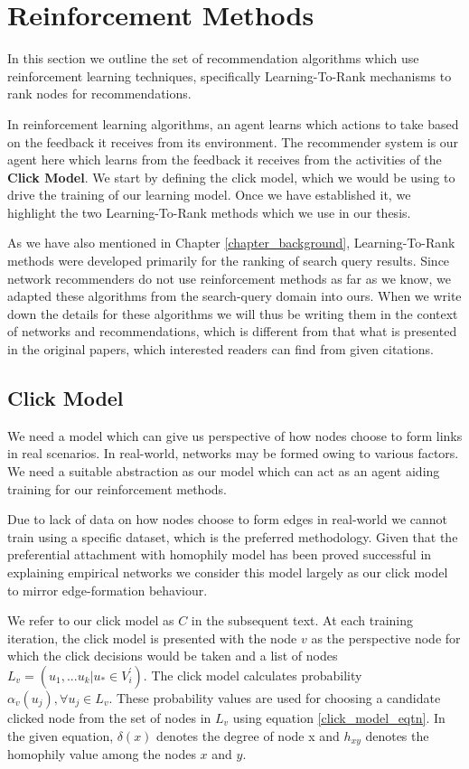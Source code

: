 \section{Reinforcement Methods}

In this section we outline the set of recommendation algorithms which use reinforcement learning techniques, specifically Learning-To-Rank mechanisms to rank nodes for recommendations. 

In reinforcement learning algorithms, an agent learns which actions to take based on the feedback it receives from its environment. The recommender system is our agent here which learns from the feedback it receives from the activities of the \textbf{Click Model}. We start by defining the click model, which we would be using to drive the training of our learning model. Once we have established it, we highlight the two Learning-To-Rank methods which we use in our thesis. 

As we have also mentioned in Chapter \ref{chapter_background}, Learning-To-Rank methods were developed primarily for the ranking of search query results. Since network recommenders do not use reinforcement methods as far as we know, we adapted these algorithms from the search-query domain into ours. When we write down the details for these algorithms we will thus be writing them in the context of networks and recommendations, which is different from that what is presented in the original papers, which interested readers can find from given citations.

\subsection{Click Model}
\label{click_model}

We need a model which can give us perspective of how nodes choose to form links in real scenarios. In real-world, networks may be formed owing to various factors. We need a suitable abstraction as our model which can act as an agent aiding training for our reinforcement methods.

Due to lack of data on how nodes choose to form edges in real-world we cannot train using a specific dataset, which is the preferred methodology. Given that the preferential attachment with homophily model \cite{karimi2018homophily} has been proved successful in explaining empirical networks we consider this model largely as our click model to mirror edge-formation behaviour. 

We refer to our click model as $C$ in the subsequent text. At each training iteration, the click model is presented with the node $v$ as the perspective node for which the click decisions would be taken and a list of nodes $L_{v}=(u_{1},...u_{k} | u_{*} \in V^{\prime}_{i})$. The click model calculates probability $\alpha_{v}(u_{j}), \forall u_{j} \in L_{v}$. These probability values are used for choosing a candidate clicked node from the set of nodes in $L_{v}$ using equation \ref{click_model_eqtn}. In the given equation, $\delta(x)$ denotes the degree of node x and $h_{xy}$ denotes the homophily value among the nodes $x$ and $y$.

